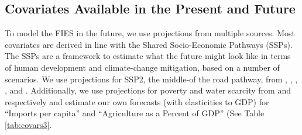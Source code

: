 \documentclass{article}
\begin{document}
\subsection{Covariates Available in the Present and Future}
To model the FIES in the future, we use projections from multiple sources. Most covariates are derived in line with the Shared Socio-Economic Pathways (SSPs). The SSPs are a framework to estimate what the future might look like in terms of human development and climate-change mitigation, based on a number of scenarios.  We use projections for SSP2, the middle-of the road pathway, from \cite{Crespo2017}, \cite{Dellink2017}, \cite{Rao2019a}, \cite{KC2017}, \cite{Jiang2017} and \cite{SSPData2017}.
Additionally, we use projections for poverty and water scarcity from \cite{WDL2020PC} and \cite{WDL2020WSC} respectively and estimate our own forecasts (with elasticities to GDP) for ``Imports per capita'' and ``Agriculture as a Percent of GDP'' (See Table \ref{tab:covars3}.
\end{document}

